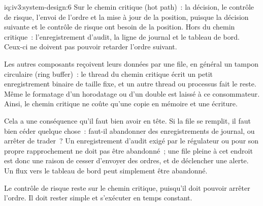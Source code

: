 \begin{solution}{iq:iv3:system-design:6}
Sur le chemin critique (hot path)~: la décision, le contrôle de risque, l'envoi de l'ordre et la mise à jour de la position, puisque la décision suivante et le contrôle de risque ont besoin de la position. Hors du chemin critique~: l'enregistrement d'audit, la ligne de journal et le tableau de bord. Ceux-ci ne doivent pas pouvoir retarder l'ordre suivant.

Les autres composants reçoivent leurs données par une file, en général un tampon circulaire (ring buffer)~: le thread du chemin critique écrit un petit enregistrement binaire de taille fixe, et un autre thread ou processus fait le reste. Même le formatage d'un horodatage ou d'un double est laissé à ce consommateur. Ainsi, le chemin critique ne coûte qu'une copie en mémoire et une écriture.

Cela a une conséquence qu'il faut bien avoir en tête. Si la file se remplit, il faut bien céder quelque chose~: faut-il abandonner des enregistrements de journal, ou arrêter de trader~? Un enregistrement d'audit exigé par le régulateur ou pour son propre rapprochement ne doit pas être abandonné~; une file pleine à cet endroit est donc une raison de cesser d'envoyer des ordres, et de déclencher une alerte. Un flux vers le tableau de bord peut simplement être abandonné.

Le contrôle de risque reste sur le chemin critique, puisqu'il doit pouvoir arrêter l'ordre. Il doit rester simple et s'exécuter en temps constant.

\end{solution}

